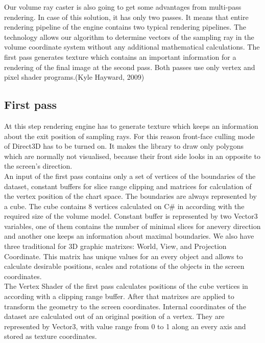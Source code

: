 \documentclass[twoside, english, 11pt]{report}
\begin{document}
Our volume ray caster is also going to get some advantages from multi-pass rendering. In case of this solution, it has only two passes. It means that entire rendering pipeline of the engine contains two typical rendering pipelines. The technology allows our algorithm to determine vectors of the sampling ray in the volume coordinate system without any additional mathematical calculations. The first pass generates texture which contains an important information for a rendering of the final image at the second pass. Both passes use only vertex and pixel shader programs.(Kyle Hayward, 2009)

\subsection{First pass}

At this step rendering engine has to generate texture which keeps an information about the exit position of sampling rays. For this reason front-face culling mode of Direct3D has to be turned on. It makes the library to draw only polygons which are normally not visualised, because their front side looks in an opposite to the screen's direction.\\

An input of the first pass contains only a set of vertices of the boundaries of the dataset, constant buffers for slice range clipping and matrices for calculation of the vertex position of the chart space. The boundaries are always represented by a cube. The cube contains 8 vertices calculated on C\# in according with the required size of the volume model. Constant buffer is represented by two Vector3 variables, one of them contains the number of minimal slices for anevery direction and another one keeps an information about maximal boundaries. We also have three traditional for 3D graphic matrixes: World, View, and Projection Coordinate. This matrix has unique values for an every object and allows to calculate desirable positions, scales and rotations of the objects in the screen coordinates.\\

The Vertex Shader of the first pass calculates positions of the cube vertices in according with a clipping range buffer. After that matrixes are applied to transform the geometry to the screen coordinates. Internal coordinates of the dataset are calculated out of an original position of a vertex. They are represented by Vector3, with value range from 0 to 1 along an every axis and stored as texture coordinates.\\
\end{document}
